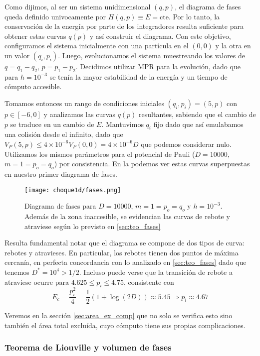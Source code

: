 Como dijimos, al ser un sistema unidimensional $(q,p)$, el diagrama de fases queda definido univocamente por $H(q,p)\equiv E = \text{cte}$.
Por lo tanto, la conservación de la energía por parte de los integradores resulta suficiente para obtener estas curvas $q(p)$ y así construir el diagrama.
Con este objetivo, configuramos el sistema inicialmente con una partícula en el $(0,0)$ y la otra en un valor $(q_i, p_i)$.
Luego, evolucionamos el sistema muestreando los valores de $q = q_1 - q_2$, $p = p_1 - p_2$.
Decidimos utilizar MPR para la evolución, dado que para $h=10^{-3}$ se tenía la mayor estabilidad de la energía y un tiempo de cómputo accesible.

Tomamos entonces un rango de condiciones iniciales $(q_i,p_i)=(5,p)$ con $p\in [-6,0]$ y analizamos las curvas $q(p)$ resultantes, sabiendo que el cambio de $p$ se traduce en un cambio de $E$. 
Mantuvimos $q_i$ fijo dado que así emulabamos una colisión desde el infinito, dado que $V_P(5,p)\leq 4\times10^{-6}V_P(0,0) = 4\times10^{-6}D$ que podemos considerar nulo.
Utilizamos los mismos parámetros para el potencial de Pauli ($D=10000$, $m=1=p_o=q_o$) por consistencia.
En la  podemos ver estas curvas superpuestas en nuestro primer diagrama de fases.

\begin{figure}[h]
	\centering
	\texttt{[image: choque1d/fases.png]}
	\caption{Diagrama de fases para $D=10000$, $m=1=p_o=q_o$ y $h=10^{-3}$. Además de la zona inaccesible, se evidencian las curvas de rebote y atraviese según lo previsto en \ref{sec:teo_fases}}
	\label{fig:ej_diag_fases}
\end{figure}

Resulta fundamental notar que el diagrama se compone de dos tipos de curva: rebotes y atravieses.
En particular, los rebotes tienen dos puntos de máxima cercanía, en perfecta concordancia con lo analizado en \ref{sec:teo_fases} dado que tenemos $D^*=10^4>1/2$.
Incluso puede verse que la transición de rebote a atraviese ocurre para $4.625\leq p_i\leq4.75$, consistente con
\[ E_c = \frac{p_i^2}{4} = \frac{1}{2}\left( 1 + \log(2D) \right) \approx 5.45 \Longrightarrow p_i \approx 4.67 \]

Veremos en la sección \ref{sec:area_ex_comp} que no solo se verifica esto sino también el área total excluída, cuyo cómputo tiene sus propias complicaciones.


\subsubsection{Teorema de Liouville y volumen de fases}

